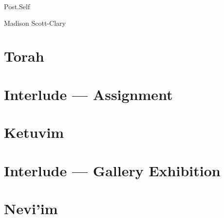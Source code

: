 \documentclass[11pt]{memoir}
\begin{document}
  \frontmatter

  

  \pagestyle{plain}

  \doublespacing

  \begin{flushright}
    \null
    \vfill
    {\Huge\DisplayFont Post.Self}

    \vfill

    {\Large\DisplayFont Madi{\kern-1.2pt}s{\kern-0.5pt}on Scott-Clar{\kern-0.4pt}y}
  \end{flushright}
  \thispagestyle{empty}

  \newpage

  

  \tableofcontents*
  \newpage
  \null
  \cleardoublepage

  \onehalfspacing


  \mainmatter

  \pagestyle{ourbook}
  \part{Torah}
  

  \part{Interlude — Assignment}
  

  \part{Ketuvim}
  

  \part{Interlude — Gallery Exhibition}
  

  \part{Nevi'im}
  
\end{document}
